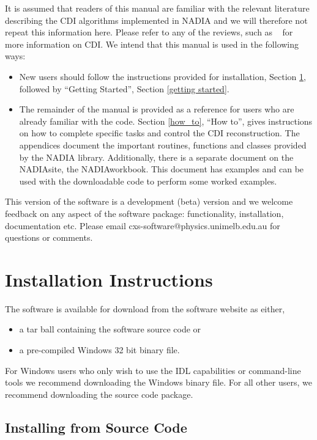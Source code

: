 \documentclass[]{nadia}
\def\name{NADIA}
\begin{document}
It is assumed that readers of this manual are familiar with the
relevant literature describing the CDI algorithms implemented in \name
and we will therefore not repeat this information here. Please refer
to any of the reviews, such as ~\cite{quiney2010coherent} for more information on CDI. We intend
that this manual is used in the following ways:
\begin{itemize}
\item New users should follow the instructions provided for
  installation, Section \ref{installation}, followed by ``Getting
  Started'', Section \ref{getting started}.
\item The remainder of the manual is provided as a reference for users
  who are already familiar with the code. Section \ref{how_to}, ``How
  to'', gives instructions on how to complete specific tasks and
  control the CDI reconstruction. The appendices document the
  important routines, functions and classes provided by the \name
  library. Additionally, there is a separate  document on the \name site, the \name workbook. This document has examples and can be used with the downloadable code to perform some worked examples.
\end{itemize}
This version of the software is a development (beta) version and we
welcome feedback on any aspect of the software package: functionality,
installation, documentation etc. Please email
cxs-software@physics.unimelb.edu.au for questions or comments.


\newpage
\section{Installation Instructions}
\label{installation}

The software is available for download from the software website as either,
\begin{itemize}
\item a tar ball containing the software source code or
\item a pre-compiled Windows 32 bit binary file.
\end{itemize}

For Windows users who only wish to use the IDL capabilities or
command-line tools we recommend downloading the Windows binary file. For
all other users, we recommend downloading the source code package.

\subsection{Installing from Source Code}
\end{document}
